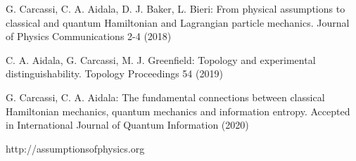 \documentclass{article}
\begin{document}

\begin{thebibliography}{4}
	
 G. Carcassi, C. A. Aidala, D. J. Baker, L. Bieri: From physical assumptions to classical and quantum Hamiltonian and Lagrangian particle mechanics. Journal of Physics Communications 2-4 (2018)

 C. A. Aidala, G. Carcassi, M. J. Greenfield: Topology and experimental distinguishability. Topology Proceedings 54 (2019)

 G. Carcassi, C. A. Aidala: The fundamental connections between classical Hamiltonian mechanics, quantum mechanics and information entropy. Accepted in International Journal of Quantum Information (2020)

 http://assumptionsofphysics.org
	
\end{thebibliography}
\end{document}
